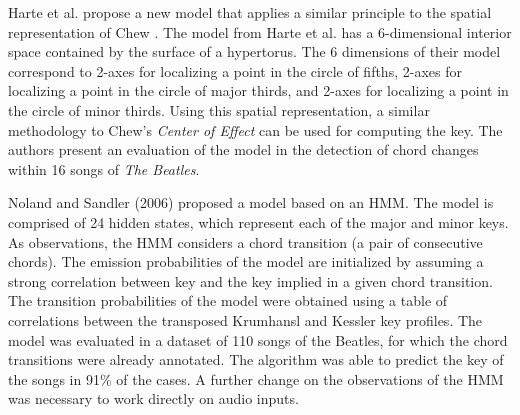 
Harte et al. \cite{harte2006detecting} propose a new model
that applies a similar principle to the spatial
representation of Chew \cite{chew2000towards}. The model
from Harte et al. has a 6-dimensional interior space
contained by the surface of a hypertorus. The 6 dimensions
of their model correspond to 2-axes for localizing a point
in the circle of fifths, 2-axes for localizing a point in
the circle of major thirds, and 2-axes for localizing a
point in the circle of minor thirds. Using this spatial
representation, a similar methodology to Chew's \emph{Center
of Effect} can be used for computing the key. The authors
present an evaluation of the model in the detection of chord
changes within 16 songs of \emph{The Beatles}.



Noland and Sandler (2006) proposed a model based on an HMM.
The model is comprised of 24 hidden states, which represent
each of the major and minor keys. As observations, the HMM
considers a chord transition (a pair of consecutive chords).
The emission probabilities of the model are initialized by
assuming a strong correlation between key and the key
implied in a given chord transition. The transition
probabilities of the model were obtained using a table of
correlations between the transposed Krumhansl and Kessler
key profiles. The model was evaluated in a dataset of 110
songs of the Beatles, for which the chord transitions were
already annotated. The algorithm was able to predict the key
of the songs in 91\% of the cases. A further change on the
observations of the HMM was necessary to work directly on
audio inputs.

